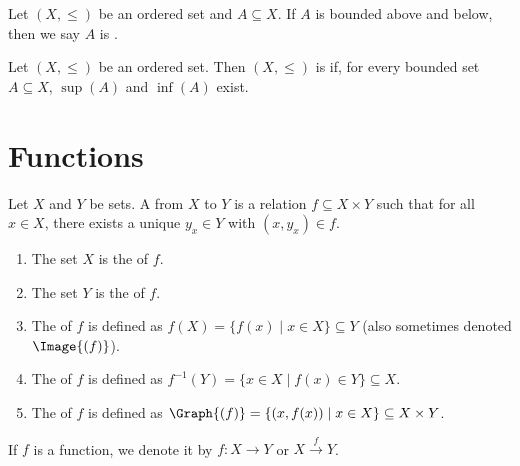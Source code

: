     \begin{definition}
        Let $(X,\leq)$ be an ordered set and $A \subseteq X$. If $A$ is bounded above and below, then we say $A$ is . 
    \end{definition}

    \begin{definition}
        Let $(X,\leq)$ be an ordered set. Then $(X,\leq)$ is  if, for every bounded set $A \subseteq X$, $\sup{(A)}$ and $\inf{(A)}$ exist.
    \end{definition}

\section{Functions}\label{sec:functions}
    \begin{definition}
        Let $X$ and $Y$ be sets. A  from $X$ to $Y$ is a relation $f \subseteq X \times Y$ such that for all $x \in X$, there exists a unique $y_x \in Y$ with $(x,y_x) \in f$.
            \begin{enumerate}[label = (\arabic*)]
                \item The set $X$ is the  of $f$.
                \item The set $Y$ is the  of $f$.
                \item The  of $f$ is defined as $f(X) = \{f(x) \mid x \in X \} \subseteq Y$ (also sometimes denoted $\Image{(f)}$).
                \item The  of $f$ is defined as $f^{-1}(Y) = \{x \in X \mid f(x) \in Y\} \subseteq X$.
                \item The  of $f$ is defined as $\Graph{(f)} = \{(x,f(x)) \mid x \in X \} \subseteq X \times Y$.
            \end{enumerate}
        If $f$ is a function, we denote it by $f:X \rightarrow Y$ or $X \xrightarrow{f} Y$.
    \end{definition}

